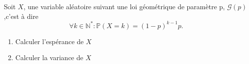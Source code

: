 \documentclass{yann}
\begin{document}
Soit $X$, une variable aléatoire suivant une loi géométrique de paramètre p, $\mathcal{G}(p)$,c'est à dire  $$\forall k \in \mathbb{N}^*:\mathbb{P}(X=k)=(1-p)^{k-1}p.$$
\begin{enumerate}
\item Calculer l'espérance de $X$
\item Calculer la variance de $X$
\end{enumerate}
\end{document}
